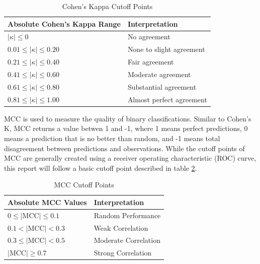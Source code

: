 \documentclass[10.7pt, onecolumn]{article}
\begin{document}
\begin{table}[H]
  \centering
  \begin{tabular}{|p{4cm}|p{3cm}|}
    \hline
    \textbf{Absolute Cohen's Kappa Range} & \textbf{Interpretation} \\
    \hline
    $|\kappa| \leq 0$ & No agreement \\
    \hline
    $0.01 \leq |\kappa| \leq 0.20$ & None to slight agreement \\
    \hline
    $0.21 \leq |\kappa| \leq 0.40$ & Fair agreement \\
    \hline
    $0.41 \leq |\kappa| \leq 0.60$ & Moderate agreement \\
    \hline
    $0.61 \leq |\kappa| \leq 0.80$ & Substantial agreement \\
    \hline
    $0.81 \leq |\kappa| \leq 1.00$ & Almost perfect agreement \\
    \hline
  \end{tabular}
  \caption{Cohen's Kappa Cutoff Points}
  \label{tab:kappaInterpretation}
\end{table}

MCC is used to measure the quality of binary classifications\cite{mcc}. Similar to Cohen's K, MCC returns a value betwen 1 and -1, where 1 means perfect predictions, 0 means a prediction that is no better than random, and -1 means total disagreement between predictions and observations. While the cutoff points of MCC are generally created using a receiver operating characteristic (ROC) curve, this report will follow a basic cutoff point described in table \ref{tab:mccInterpretation}.

\begin{table}[H]
  \centering
  \begin{tabular}{|p{4cm}|p{3cm}|}
    \hline
    \textbf{Absolute MCC Values} & \textbf{Interpretation} \\
    \hline
    $0 \leq |\text{MCC}| \leq 0.1$ & Random Performance \\
    \hline
    $0.1 < |\text{MCC}| < 0.3$ & Weak Correlation \\
    \hline
    $0.3 \leq |\text{MCC}| < 0.5$ & Moderate Correlation \\
    \hline
    $|\text{MCC}| \geq 0.7$ & Strong Correlation \\
    \hline
  \end{tabular}
  \caption{MCC Cutoff Points}
  \label{tab:mccInterpretation}
\end{table}
\end{document}
